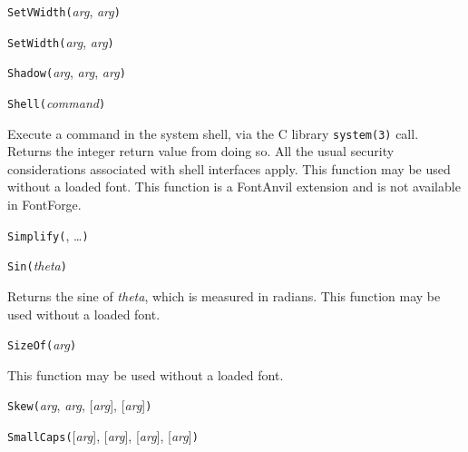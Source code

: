 
\texttt{SetVWidth(}\textit{arg}, \textit{arg}\texttt{)}



\texttt{SetWidth(}\textit{arg}, \textit{arg}\texttt{)}



\texttt{Shadow(}\textit{arg}, \textit{arg}, \textit{arg}\texttt{)}



\texttt{Shell(}\textit{command}\texttt{)}

Execute a command in the system shell, via the C library \texttt{system(3)}
call.  Returns the integer return value from doing so.  All the usual
security considerations associated with shell interfaces apply.
This function may be used without a loaded font.  This \FFdiff function is a
FontAnvil extension and is not available in FontForge.



\texttt{Simplify(}, \ldots\texttt{)}



\texttt{Sin(}\textit{theta}\texttt{)}

Returns the sine of \textit{theta}, which is measured in radians.
This function may be used without a loaded font.



\texttt{SizeOf(}\textit{arg}\texttt{)}

This function may be used without a loaded font.



\texttt{Skew(}\textit{arg}, \textit{arg}, [\textit{arg}], [\textit{arg}]\texttt{)}



\texttt{SmallCaps(}[\textit{arg}], [\textit{arg}], [\textit{arg}], [\textit{arg}]\texttt{)}

